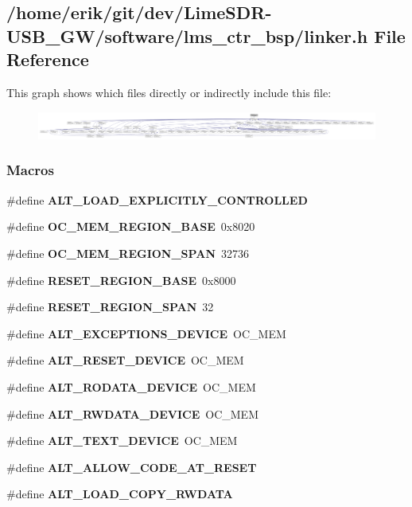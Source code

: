 \subsection{/home/erik/git/dev/\+Lime\+S\+D\+R-\/\+U\+S\+B\+\_\+\+G\+W/software/lms\+\_\+ctr\+\_\+bsp/linker.h File Reference}
\label{linker_8h}
This graph shows which files directly or indirectly include this file\+:
\nopagebreak
\begin{figure}[H]
\begin{center}
\leavevmode
\includegraphics[width=350pt]{d5/d57/linker_8h__dep__incl}
\end{center}
\end{figure}
\subsubsection*{Macros}
\begin{DoxyCompactItemize}
\item 
\#define {\bf A\+L\+T\+\_\+\+L\+O\+A\+D\+\_\+\+E\+X\+P\+L\+I\+C\+I\+T\+L\+Y\+\_\+\+C\+O\+N\+T\+R\+O\+L\+L\+ED}
\item 
\#define {\bf O\+C\+\_\+\+M\+E\+M\+\_\+\+R\+E\+G\+I\+O\+N\+\_\+\+B\+A\+SE}~0x8020
\item 
\#define {\bf O\+C\+\_\+\+M\+E\+M\+\_\+\+R\+E\+G\+I\+O\+N\+\_\+\+S\+P\+AN}~32736
\item 
\#define {\bf R\+E\+S\+E\+T\+\_\+\+R\+E\+G\+I\+O\+N\+\_\+\+B\+A\+SE}~0x8000
\item 
\#define {\bf R\+E\+S\+E\+T\+\_\+\+R\+E\+G\+I\+O\+N\+\_\+\+S\+P\+AN}~32
\item 
\#define {\bf A\+L\+T\+\_\+\+E\+X\+C\+E\+P\+T\+I\+O\+N\+S\+\_\+\+D\+E\+V\+I\+CE}~O\+C\+\_\+\+M\+EM
\item 
\#define {\bf A\+L\+T\+\_\+\+R\+E\+S\+E\+T\+\_\+\+D\+E\+V\+I\+CE}~O\+C\+\_\+\+M\+EM
\item 
\#define {\bf A\+L\+T\+\_\+\+R\+O\+D\+A\+T\+A\+\_\+\+D\+E\+V\+I\+CE}~O\+C\+\_\+\+M\+EM
\item 
\#define {\bf A\+L\+T\+\_\+\+R\+W\+D\+A\+T\+A\+\_\+\+D\+E\+V\+I\+CE}~O\+C\+\_\+\+M\+EM
\item 
\#define {\bf A\+L\+T\+\_\+\+T\+E\+X\+T\+\_\+\+D\+E\+V\+I\+CE}~O\+C\+\_\+\+M\+EM
\item 
\#define {\bf A\+L\+T\+\_\+\+A\+L\+L\+O\+W\+\_\+\+C\+O\+D\+E\+\_\+\+A\+T\+\_\+\+R\+E\+S\+ET}
\item 
\#define {\bf A\+L\+T\+\_\+\+L\+O\+A\+D\+\_\+\+C\+O\+P\+Y\+\_\+\+R\+W\+D\+A\+TA}
\end{DoxyCompactItemize}


